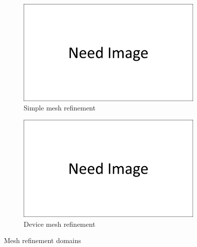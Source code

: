 \begin{figure}
    \centering
    \begin{subfigure}[b]{0.45\textwidth}
        \centering
        \includegraphics[width=\textwidth]{images/need_image.png}
        \caption{Simple mesh refinement}
        \label{fig:simple_mesh_refinement_domain}
    \end{subfigure}
    \hfill
    \begin{subfigure}[b]{0.45\textwidth}
        \centering
        \includegraphics[width=\textwidth]{images/need_image.png}
        \caption{Device mesh refinement}
        \label{fig:device_mesh_refinement_domain}
    \end{subfigure}
    \caption{Mesh refinement domains}
    \label{fig:mesh_refinement_domain}
\end{figure}

